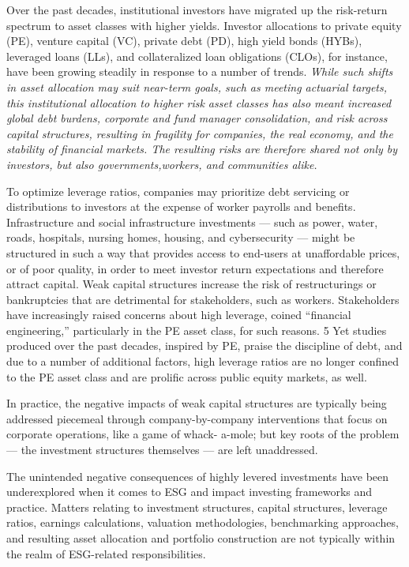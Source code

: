 \documentclass[
]{book}
\begin{document}
Over the past decades, institutional investors have migrated up
the risk-return spectrum to asset classes with higher yields.
Investor allocations to private equity (PE), venture capital (VC), private debt (PD),
high yield bonds (HYBs), leveraged loans (LLs), and
collateralized loan obligations (CLOs), for instance,
have been growing steadily in response to a number of trends.
\emph{While such shifts in asset allocation may suit near-term goals,
such as meeting actuarial targets, this institutional allocation to higher risk asset
classes has also meant increased global debt burdens, corporate and
fund manager consolidation, and risk across capital structures,
resulting in fragility for companies, the real economy, and the stability of
financial markets.
The resulting risks are therefore shared not only by investors,
but also governments,workers, and communities alike.}

To optimize leverage ratios, companies may prioritize debt servicing or distributions to investors at the
expense of worker payrolls and benefits. Infrastructure and social infrastructure investments --- such as
power, water, roads, hospitals, nursing homes, housing, and cybersecurity --- might be structured in
such a way that provides access to end-users at unaffordable prices, or of poor quality, in order to meet
investor return expectations and therefore attract capital. Weak capital structures increase the risk of
restructurings or bankruptcies that are detrimental for stakeholders, such as workers. Stakeholders have
increasingly raised concerns about high leverage, coined ``financial engineering,'' particularly in the PE
asset class, for such reasons. 5 Yet studies produced over the past decades, inspired by PE, praise the
discipline of debt, and due to a number of additional factors, high leverage ratios are no longer confined
to the PE asset class and are prolific across public equity markets, as well.

In practice, the negative impacts of weak capital structures are typically being addressed piecemeal
through company-by-company interventions that focus on corporate operations, like a game of whack-
a-mole; but key roots of the problem --- the investment structures themselves --- are left unaddressed.

The unintended negative consequences of highly levered investments have been underexplored when it
comes to ESG and impact investing frameworks and practice. Matters relating to investment structures,
capital structures, leverage ratios, earnings calculations, valuation methodologies, benchmarking
approaches, and resulting asset allocation and portfolio construction are not typically within the realm
of ESG-related responsibilities.
\end{document}
